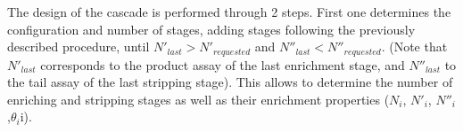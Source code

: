 \documentclass{anstrans}
\begin{document}
The design of the cascade is performed through 2 steps. First one determines the
configuration and number of stages, adding stages following the previously
described procedure, until $N'_{last} > N'_{requested}$ and $N''_{last} <
N''_{requested}$. (Note that $N'_{last}$ corresponds to the product assay of the
last enrichment stage, and $N''_{last}$ to the tail assay of the last stripping
stage). This allows to determine the number of enriching and stripping stages as
well as their enrichment properties ($N_{i}$, $N'_{i}$,
$N''_{i}$,$\theta_{i}$i).
\end{document}
